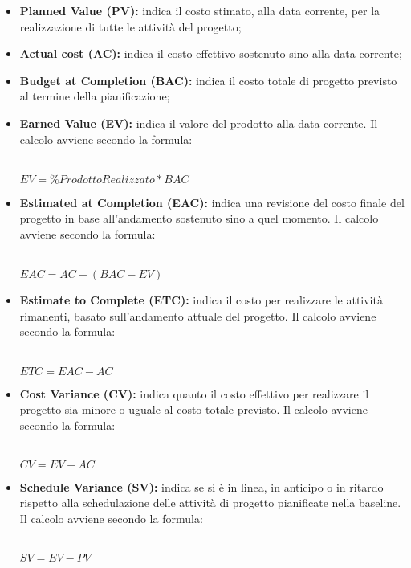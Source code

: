 \begin{itemize}
	\item \textbf{Planned Value (PV):} indica il costo stimato, alla data corrente, per la realizzazione di tutte le attività del progetto;
	\item \textbf{Actual cost (AC):} indica il costo effettivo sostenuto sino alla data corrente;
	\item \textbf{Budget at Completion (BAC):} indica il costo totale di progetto previsto al termine della pianificazione;
	\item \textbf{Earned Value (EV):} indica il valore del prodotto alla data corrente. Il calcolo avviene secondo la formula:\\\\
	\centerline{
		\begin{math}
		EV=\% ProdottoRealizzato*BAC
		\end{math}
	}
	\item \textbf{Estimated at Completion (EAC):} indica una revisione del costo finale del progetto in base all'andamento sostenuto sino a quel momento. Il calcolo avviene secondo la formula:\\\\
	\centerline{
		\begin{math}
		EAC=AC+(BAC-EV)
		\end{math}
	}
	\item \textbf{Estimate to Complete (ETC):} indica il costo per realizzare le attività rimanenti, basato sull'andamento attuale del progetto. Il calcolo avviene secondo la formula:\\\\
	\centerline{
		\begin{math}
		ETC=EAC-AC
		\end{math}
	}
	\item \textbf{Cost Variance	(CV):} indica quanto il costo effettivo per realizzare il progetto sia minore o uguale al costo totale previsto. Il calcolo avviene secondo la formula:\\\\
	\centerline{
		\begin{math}
		CV=EV-AC
		\end{math}
	}
	\item \textbf{Schedule Variance	(SV):} indica se si è in linea, in anticipo o in ritardo rispetto alla schedulazione delle attività di progetto pianificate nella baseline. Il calcolo avviene secondo la formula:\\\\
	\centerline{
		\begin{math}
		SV=EV-PV
		\end{math}
	}
\end{itemize}
